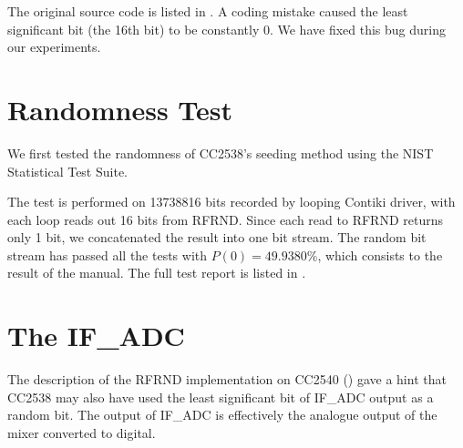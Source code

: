 The original source code is listed in . A coding mistake caused the least significant bit (the 16th bit) to be constantly 0. We have fixed this bug during our experiments.

\section{Randomness Test}
We first tested the randomness of CC2538's seeding method using the NIST Statistical Test Suite\cite{NistTestSuite}. 

The test is performed on 13738816 bits recorded by looping Contiki driver, with each loop reads out 16 bits from RFRND. Since each read to RFRND returns only 1 bit, we concatenated the result into one bit stream. The random bit stream has passed all the tests with $P(0) = 49.9380\%$, which consists to the result of the manual. The full test report is listed in .
%
%
%
%

\section{The IF\_ADC}

The description of the RFRND implementation on CC2540 () gave a hint that CC2538 may also have used the least significant bit of IF\_ADC output as  a random bit. The output of IF\_ADC is effectively the analogue output of the mixer converted to digital.

